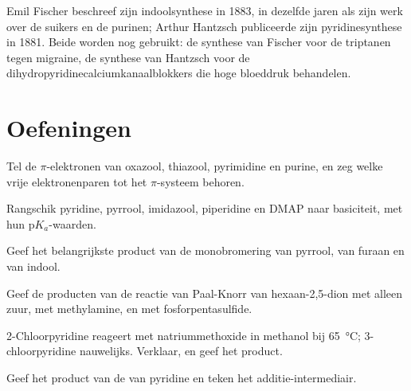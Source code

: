 \begin{history}
Emil Fischer beschreef zijn indoolsynthese in 1883, in dezelfde jaren als
zijn werk over de suikers en de purinen; Arthur Hantzsch publiceerde zijn
pyridinesynthese in 1881. Beide worden nog gebruikt: de synthese van
Fischer voor de triptanen tegen migraine, de synthese van Hantzsch voor
de dihydropyridinecalciumkanaalblokkers die hoge bloeddruk behandelen.
\end{history}

\section{Oefeningen}

\begin{exercise}[$\star$]\label{exo:b3:heterocycles:1}
Tel de $\pi$-elektronen van oxazool, thiazool, pyrimidine en purine, en zeg welke
vrije elektronenparen tot het $\pi$-systeem behoren.
\end{exercise}

\begin{exercise}[$\star$]\label{exo:b3:heterocycles:2}
Rangschik pyridine, pyrrool, imidazool, piperidine en DMAP naar
basiciteit, met hun
$\mathrm pK_a$-waarden.
\end{exercise}

\begin{exercise}[$\star$]\label{exo:b3:heterocycles:3}
Geef het belangrijkste product van de monobromering van pyrrool, van
furaan en van indool.
\end{exercise}

\begin{exercise}[$\star$]\label{exo:b3:heterocycles:4}
Geef de producten van de reactie van Paal-Knorr van hexaan-2,5-dion met
alleen zuur, met methylamine, en met fosforpentasulfide.
\end{exercise}

\begin{exercise}[$\star\star$]\label{exo:b3:heterocycles:5}
2-Chloorpyridine reageert met natriummethoxide in methanol bij \qty{65}{\celsius}; 3-chloorpyridine
nauwelijks. Verklaar, en geef het product.
\end{exercise}

\begin{exercise}[$\star\star$]\label{exo:b3:heterocycles:6}
Geef het product van de  van pyridine en teken het
additie-intermediair.
\end{exercise}

